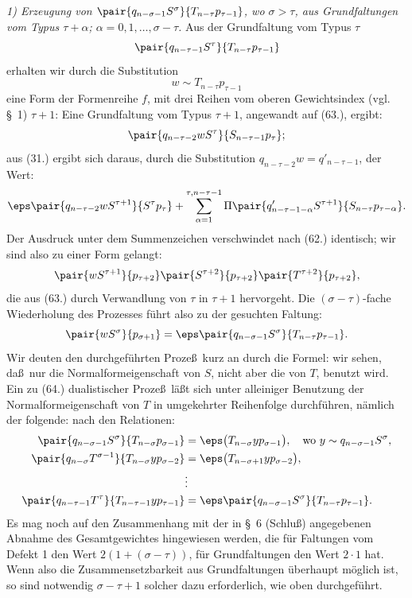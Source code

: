 \emph{1) Erzeugung von $\pair{q_{n-\sigma-1}S^\sigma}{T_{n-\tau}p_{\tau-1}}$, wo $\sigma>\tau$, aus Grundfaltungen vom Typus $\tau+\alpha$; $\alpha=0,1,\ldots,\sigma-\tau$.} Aus der Grundfaltung vom Typus $\tau$
\[
 \pair{q_{n-\tau-1}S^\tau}{T_{n-\tau}p_{\tau-1}}
\]
erhalten wir durch die Substitution
\[
 w\sim T_{n-\tau}p_{\tau-1}
\]
eine Form der Formenreihe $f$, mit drei Reihen vom oberen Gewichtsindex (vgl. \S\ 1) $\tau+1$:
Eine Grundfaltung vom Typus $\tau+1$, angewandt auf (63.), ergibt:
\[
 \pair{q_{n-\tau-2}wS^\tau}{S_{n-\tau-1}p_\tau};
\]
aus (31.) ergibt sich daraus, durch die Substitution $q_{n-\tau-2}w=q'_{n-\tau-1}$, der Wert:
\[
 \eps\pair{q_{n-\tau-2}wS^{\tau+1}}{S^\tau p_\tau}
 +\sum_{\alpha=1}^{\tau,n-\tau-1}\Pi\pair{q'_{n-\tau-1-\alpha}S^{\tau+1}}{S_{n-\tau}p_{\tau-\alpha}}.
\]
Der Ausdruck unter dem Summenzeichen verschwindet nach (62.) identisch; wir sind also zu einer Form gelangt:
\[
 \pair{wS^{\tau+1}}{p_{\tau+2}}\pair{S^{\tau+2}}{p_{\tau+2}}\pair{T^{\tau+2}}{p_{\tau+2}},
\]
die aus (63.) durch Verwandlung von $\tau$ in $\tau+1$ hervorgeht. Die $(\sigma-\tau)$-fache Wiederholung des Prozesses f\"uhrt also zu der gesuchten Faltung:
\[
 \pair{wS^\sigma}{p_{\sigma+1}}=\eps\pair{q_{n-\sigma-1}S^\sigma}{T_{n-\tau}p_{\tau-1}}.
\]
Wir deuten den durchgef\"uhrten Proze\ss\ kurz an durch die Formel:
wir sehen, da\ss\ nur die Normalformeigenschaft von $S$, nicht aber die von $T$, benutzt wird. Ein zu (64.) dualistischer Proze\ss\ l\"a\ss t sich unter alleiniger Benutzung der Normalformeigenschaft von $T$ in umgekehrter Reihenfolge durchf\"uhren, n\"amlich der folgende:
nach den Relationen:
\begin{align*}
\pair{q_{n-\sigma-1}S^\sigma}{T_{n-\sigma}p_{\sigma-1}}&=\eps\bigl(T_{n-\sigma}y p_{\sigma-1}\bigr),\quad \text{wo }y\sim q_{n-\sigma-1}S^\sigma,\\
\pair{q_{n-\sigma}T^{\sigma-1}}{T_{n-\sigma}yp_{\sigma-2}}&=\eps\bigl(T_{n-\sigma+1}y p_{\sigma-2}\bigr),\\
&\vdots\\
\pair{q_{n-\tau-1}T^\tau}{T_{n-\tau-1}yp_{\tau-1}}&=\eps\pair{q_{n-\sigma-1}S^\sigma}{T_{n-\tau}p_{\tau-1}}.
\end{align*}
Es mag noch auf den Zusammenhang mit der in \S\ 6 (Schlu\ss) angegebenen Abnahme des Gesamtgewichtes hingewiesen werden, die f\"ur Faltungen vom Defekt 1 den Wert $2(1+(\sigma-\tau))$, f\"ur Grundfaltungen den Wert $2\cdot1$ hat. Wenn also die Zusammensetzbarkeit aus Grundfaltungen \"uberhaupt m\"oglich ist, so sind notwendig $\sigma-\tau+1$ solcher dazu erforderlich, wie oben durchgef\"uhrt.
